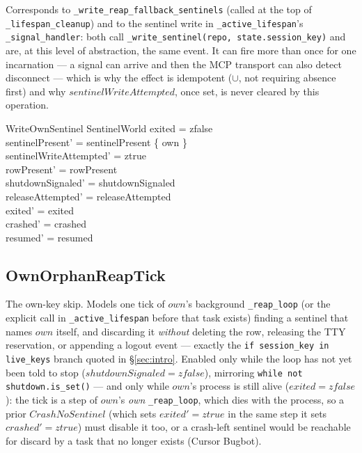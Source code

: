 \documentclass[a4paper,10pt,fleqn]{article}
\begin{document}
Corresponds to \texttt{\_write\_reap\_fallback\_sentinels} (called at
the top of \texttt{\_lifespan\_cleanup}) and to the sentinel write in
\texttt{\_active\_lifespan}'s \texttt{\_signal\_handler}: both call
\texttt{\_write\_sentinel(repo, state.session\_key)} and are, at this
level of abstraction, the same event.  It can fire more than once for
one incarnation --- a signal can arrive and then the MCP transport can
also detect disconnect --- which is why the effect is idempotent
($\cup$, not requiring absence first) and why $sentinelWriteAttempted$,
once set, is never cleared by this operation.

\begin{schema}{WriteOwnSentinel}
  \Delta SentinelWorld
  \where
  exited = zfalse \\
  sentinelPresent' = sentinelPresent \cup \{ own \} \\
  sentinelWriteAttempted' = ztrue \\
  rowPresent' = rowPresent \\
  shutdownSignaled' = shutdownSignaled \\
  releaseAttempted' = releaseAttempted \\
  exited' = exited \\
  crashed' = crashed \\
  resumed' = resumed
\end{schema}

\subsection{OwnOrphanReapTick}

The own-key skip.  Models one tick of $own$'s background
\texttt{\_reap\_loop} (or the explicit call in
\texttt{\_active\_lifespan} before that task exists) finding a sentinel
that names $own$ itself, and discarding it \emph{without} deleting the
row, releasing the TTY reservation, or appending a logout event ---
exactly the \texttt{if session\_key in live\_keys} branch quoted in
\S\ref{sec:intro}.  Enabled only while the loop has not yet been told to
stop ($shutdownSignaled = zfalse$), mirroring
\texttt{while not shutdown.is\_set()} --- and only while $own$'s process
is still alive ($exited = zfalse$): the tick is a step of $own$'s
\emph{own} \texttt{\_reap\_loop}, which dies with the process, so a
prior $CrashNoSentinel$ (which sets $exited' = ztrue$ in the same step
it sets $crashed' = ztrue$) must disable it too, or a crash-left
sentinel would be reachable for discard by a task that no longer
exists (Cursor Bugbot).
\end{document}
